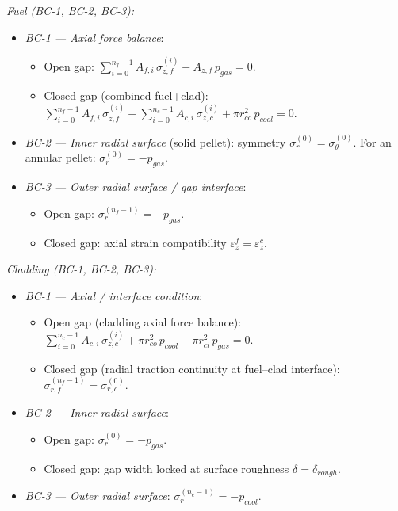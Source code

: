 \begin{refsection}
\emph{Fuel (BC-1, BC-2, BC-3):}
\begin{itemize}
\item \emph{BC-1 — Axial force balance}:
        \begin{itemize}
\item Open gap: $\displaystyle\sum_{i=0}^{n_f-1} A_{f,i}\,\sigma_{z,f}^{(i)} + A_{z,f}\,p_{gas} = 0$.
\item Closed gap (combined fuel+clad): $\displaystyle\sum_{i=0}^{n_f-1} A_{f,i}\,\sigma_{z,f}^{(i)} + \sum_{i=0}^{n_c-1} A_{c,i}\,\sigma_{z,c}^{(i)} + \pi r_{co}^2\,p_{cool} = 0$.
        \end{itemize}
\item \emph{BC-2 — Inner radial surface} (solid pellet): symmetry $\sigma_r^{(0)} = \sigma_\theta^{(0)}$.  For an annular pellet: $\sigma_r^{(0)} = -p_{gas}$.
\item \emph{BC-3 — Outer radial surface / gap interface}:
        \begin{itemize}
\item Open gap: $\sigma_r^{(n_f-1)} = -p_{gas}$.
\item Closed gap: axial strain compatibility $\varepsilon_z^{f} = \varepsilon_z^{c}$.
        \end{itemize}
\end{itemize}

\emph{Cladding (BC-1, BC-2, BC-3):}
\begin{itemize}
\item \emph{BC-1 — Axial / interface condition}:
        \begin{itemize}
\item Open gap (cladding axial force balance): $\displaystyle\sum_{i=0}^{n_c-1} A_{c,i}\,\sigma_{z,c}^{(i)} + \pi r_{co}^2\,p_{cool} - \pi r_{ci}^2\,p_{gas} = 0$.
\item Closed gap (radial traction continuity at fuel–clad interface): $\sigma_{r,f}^{(n_f-1)} = \sigma_{r,c}^{(0)}$.
        \end{itemize}
\item \emph{BC-2 — Inner radial surface}:
        \begin{itemize}
\item Open gap: $\sigma_r^{(0)} = -p_{gas}$.
\item Closed gap: gap width locked at surface roughness $\delta = \delta_{rough}$.
        \end{itemize}
\item \emph{BC-3 — Outer radial surface}: $\sigma_r^{(n_c-1)} = -p_{cool}$.
\end{itemize}


\end{refsection}
